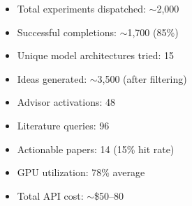 \documentclass{article}
\begin{document}
\begin{itemize}[leftmargin=1.5em,itemsep=1pt]
    \item Total experiments dispatched: ${\sim}$2,000
    \item Successful completions: ${\sim}$1,700 (85\%)
    \item Unique model architectures tried: 15
    \item Ideas generated: ${\sim}$3,500 (after filtering)
    \item Advisor activations: 48
    \item Literature queries: 96
    \item Actionable papers: 14 (15\% hit rate)
    \item GPU utilization: 78\% average
    \item Total API cost: ${\sim}$\$50--80
\end{itemize}
\end{document}

